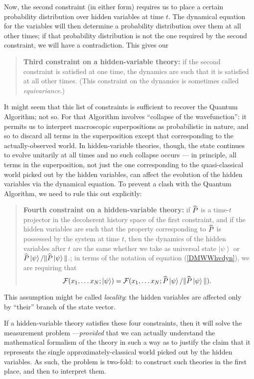 \documentclass[12pt]{article}
\newcommand{\be}{\begin{equation}}
\newcommand{\ee}{\end{equation}}
\newcommand{\mc}[1]{\ensuremath{\mathcal{#1}}}
\newcommand{\ket}[1]{\ensuremath{\left|  #1 \right\rangle}}
\newcommand{\op}[1]{\ensuremath{\widehat{\textsf{\ensuremath{#1}}}}}
\begin{document}
Now, the second constraint (in either form) requires us to place a certain probability distribution over hidden variables at time $t$. The dynamical equation for the variables will then determine a probability distribution over them at all other times; if that probability distribution is not the one required by the second constraint, we will have a contradiction. This gives  our
\begin{quote}
\textbf{Third constraint on a hidden-variable theory:} if the second constraint is satisfied at one time, the dynamics are such that it is satisfied at all other times. (This constraint on the dynamics is sometimes called \emph{equivariance}.)
\end{quote}
It might seem that this list of constraints is sufficient to recover the Quantum Algorithm; not so. For that Algorithm involves  ``collapse of the wavefunction'': it permits us to interpret macroscopic superpositions as probabilistic in nature, and so to discard all terms in the superposition except that corresponding to the actually-observed world. In hidden-variable theories, though, the state continues to evolve unitarily at all times and no such collapse occurs --- in principle, all terms in the superposition, not just the one corresponding to the quasi-classical world picked out by the hidden variables, can affect the evolution of the hidden variables via the dynamical equation. To prevent a clash with the Quantum Algorithm, we need to rule this out explicitly:
\begin{quote}
\textbf{Fourth constraint on a hidden-variable theory:} if \op{P} is a time-$t$ projector in the decoherent history space of the first constraint, and if the hidden variables are such that the property corresponding to \op{P} is possessed by the system at time $t$, then the dynamics of the hidden variables after $t$ are the same whether we take as universal state \ket{\psi} or $\op{P}\ket{\psi}/\|\op{P}\ket{\psi}\|$.; in terms of the notation of equation (\ref{DMWWhvdyn}), we are requiring that
\be
\mc{F}(x_1, \ldots x_N; \ket{\psi})=
\mc{F}(x_1, \ldots x_N; \op{P}\ket{\psi}/\|\op{P}\ket{\psi}\|).
\ee 
\end{quote}
This assumption might be called \emph{locality}: the hidden variables are affected only by ``their'' branch of the state vector. 

If a hidden-variable theory satisfies these four constraints, then it will solve the measurement problem ---\emph{provided} that we can actually understand the mathematical formalism of the theory in such a way as to justify the claim that it represents the single approximately-classical world picked out by  the hidden variables. As such, the problem is two-fold: to construct such theories in the first place, and then to interpret them. 
\end{document}
